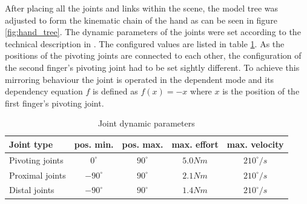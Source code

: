 After placing all the joints and links within the scene, the model tree was adjusted to form the kinematic chain of the hand as can be seen in figure \ref{fig:hand_tree}. The dynamic parameters of the joints were set according to the technical description in \citep{schunk2010}. The configured values are listed in table \ref{tbl:tech_data}. As the positions of the pivoting joints are connected to each other, the configuration of the second finger's pivoting joint had to be set sightly different. To achieve this mirroring behaviour the joint is operated in the dependent mode and its dependency equation $f$ is defined as $f(x) = -x$ where $x$ is the position of the first finger's pivoting joint.
\begin{table}[h]
  \centering
  \begin{tabular}[h]{|l|c|c|c|c|} \hline
	\textbf{Joint type} & \textbf{pos. min.} & \textbf{pos. max.} & \textbf{max. effort} & \textbf{max. velocity} \\ \hline
	Pivoting joints & $0^{\circ}$ & $90^{\circ}$ & $5.0 Nm$ & $210^{\circ}/s$ \\
	Proximal joints & $-90^{\circ}$ & $90^{\circ}$ & $2.1 Nm$ & $210^{\circ}/s$ \\
	Distal joints & $-90^{\circ}$ & $90^{\circ}$ & $1.4 Nm$ & $210^{\circ}/s$ \\ \hline
  \end{tabular}
  \caption{Joint dynamic parameters}
  \label{tbl:tech_data}
\end{table} \\

